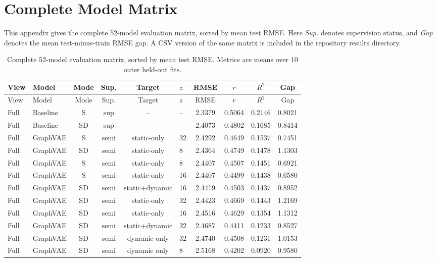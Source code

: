\chapter{Complete Model Matrix}
\label{ch:appendix_matrix}

This appendix gives the complete 52-model evaluation matrix, sorted by mean test RMSE. Here \emph{Sup.} denotes supervision status, and \emph{Gap} denotes the mean test-minus-train RMSE gap. A CSV version of the same matrix is included in the repository results directory.

\begin{landscape}
\setlength{\LTleft}{0pt}
\setlength{\LTright}{0pt}
\scriptsize
\begin{longtable}{llccclcccc}
\caption{Complete 52-model evaluation matrix, sorted by mean test RMSE. Metrics are means over 10 outer held-out fits.}\label{tab:full-matrix}\\
\hline
View & Model & Mode & Sup. & Target & $z$ & RMSE & $r$ & $R^2$ & Gap \\
\hline
\endfirsthead
\hline
View & Model & Mode & Sup. & Target & $z$ & RMSE & $r$ & $R^2$ & Gap \\
\hline
\endhead
Full & Baseline & S & sup & -- & -- & 2.3379 & 0.5064 & 0.2146 & 0.8021 \\
Full & Baseline & SD & sup & -- & -- & 2.4073 & 0.4802 & 0.1685 & 0.8414 \\
Full & GraphVAE & S & semi & static-only & 32 & 2.4292 & 0.4649 & 0.1537 & 0.7451 \\
Full & GraphVAE & SD & semi & static-only & 8 & 2.4364 & 0.4749 & 0.1478 & 1.1303 \\
Full & GraphVAE & S & semi & static-only & 8 & 2.4407 & 0.4507 & 0.1451 & 0.6921 \\
Full & GraphVAE & S & semi & static-only & 16 & 2.4407 & 0.4499 & 0.1438 & 0.6580 \\
Full & GraphVAE & SD & semi & static+dynamic & 16 & 2.4419 & 0.4503 & 0.1437 & 0.8952 \\
Full & GraphVAE & SD & semi & static-only & 32 & 2.4423 & 0.4669 & 0.1443 & 1.2169 \\
Full & GraphVAE & SD & semi & static-only & 16 & 2.4516 & 0.4629 & 0.1354 & 1.1312 \\
Full & GraphVAE & SD & semi & static+dynamic & 32 & 2.4687 & 0.4411 & 0.1233 & 0.8527 \\
Full & GraphVAE & SD & semi & dynamic only & 32 & 2.4740 & 0.4508 & 0.1231 & 1.0153 \\
Full & GraphVAE & SD & semi & dynamic only & 8 & 2.5168 & 0.4202 & 0.0920 & 0.9580 \\

\end{longtable}
\end{landscape}
